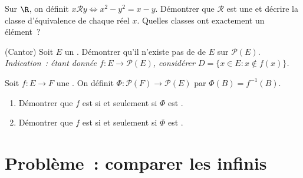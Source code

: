 \begin{exercise}[$\star\star$]\label{exo:b1:logic:10}
Sur $\R$, on définit $x \mathbin{\mathcal{R}} y \iff x^2 - y^2 = x - y$.
Démontrer que $\mathcal{R}$ est une  et décrire la
classe d'équivalence de chaque réel $x$. Quelles classes ont exactement
un élément~?
\end{exercise}

\begin{exercise}[$\star\star\star$]\label{exo:b1:logic:11}
(Cantor) Soit $E$ un . Démontrer qu'il n'existe pas de
 de $E$ sur $\mathcal{P}(E)$. \emph{Indication~: étant donnée
$f \colon E \to \mathcal{P}(E)$, considérer $D = \{x \in E : x \notin
f(x)\}$.}
\end{exercise}

\begin{exercise}[$\star\star\star$]\label{exo:b1:logic:12}
Soit $f \colon E \to F$ une . On définit $\Phi \colon
\mathcal{P}(F) \to \mathcal{P}(E)$ par $\Phi(B) = f^{-1}(B)$.
\begin{enumerate}
  \item Démontrer que $f$ est  si et seulement si $\Phi$ est
        .
  \item Démontrer que $f$ est  si et seulement si $\Phi$ est
        .
\end{enumerate}
\end{exercise}

\section{Problème~: comparer les infinis}

